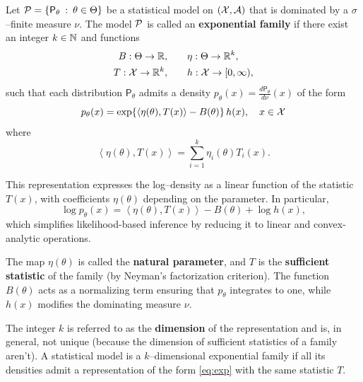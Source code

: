 \begin{definition}[]
    Let \(\mathcal{P}=\{\mathsf{P}_{\theta} \::\: \theta\in \Theta\}\) be a statistical model on
    \((\mathcal{X},\mathcal{A})\) that is dominated by a \(\sigma\)--finite measure \(\nu\).
    The model \(\mathcal{P}\) is called an \textbf{exponential family} if there exist an integer
    \(k \in \mathbb{N}\) and functions
    \begin{align*}
        B : \Theta \to \mathbb{R}, \quad \quad 
        &\eta : \Theta \to \mathbb{R}^{k},\\
        T : \mathcal{X}\to\mathbb{R}^{k}, \quad \quad 
        &h:\mathcal{X}\to[0,\infty),
    \end{align*}
    such that each distribution \(\mathsf{P}_{\theta}\) admits a density
    \(p_{\theta}(x) = \frac{d \mathsf{P}_{\theta}}{d \nu}(x)\) of the form
    \begin{equation}
        \label{eq:exp}
        p_{\theta}(x)
        =
        \exp\!\left\{
            \left\langle \eta(\theta), T(x) \right\rangle
            - B(\theta)
        \right\} h(x),
        \quad x \in \mathcal{X}
    \end{equation}
    where 
    \[
        \left<\eta(\theta),T(x) \right> = \sum\limits_{i=1}^{k} \eta_{i}(\theta)T_{i}(x). 
    \]
    
\end{definition}

This representation expresses the log--density as a linear function of the statistic \(T(x)\),
with coefficients \(\eta(\theta)\) depending on the parameter. In particular,
\[
\log p_{\theta}(x)
=
\left\langle \eta(\theta), T(x) \right\rangle
- B(\theta)
+ \log h(x),
\]
which simplifies likelihood-based inference by reducing it to linear and convex-analytic
operations.

The map \(\eta(\theta)\) is called the \textbf{natural parameter}, and \(T\) is the
\textbf{sufficient statistic} of the family (by Neyman's factorization criterion).
The function \(B(\theta)\) acts as a normalizing term ensuring that \(p_{\theta}\) integrates
to one, while \(h(x)\) modifies the dominating measure \(\nu\).

The integer \(k\) is referred to as the \textbf{dimension} of the representation and is, in
general, not unique (because the dimension of sufficient statistics of a family aren't). A statistical model is a \(k\)--dimensional exponential family if all its
densities admit a representation of the form \eqref{eq:exp} with the same statistic \(T\).

